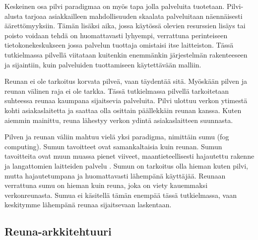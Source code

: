 Keskeinen osa pilvi paradigmaa on myös tapa jolla palveluita tuotetaan.
Pilvi-alusta tarjoaa asiakkailleen mahdollisuuden skaalata palveluitaan näennäisesti äärettömyyksiin.
Tämän lisäksi aika, jossa käytössä olevien resurssien lisäys tai poisto voidaan tehdä on huomattavasti lyhyempi, verrattuna perinteiseen tietokonekeskukseen jossa palvelun tuottaja omistaisi itse laitteiston.
Tässä tutkielmassa pilvellä viitataan kuitenkin enemmänkin järjestelmän rakenteeseen ja sijaintiin, kuin palveluiden tuottamiseen käytettävään malliin.

Reunan ei ole tarkoitus korvata pilveä, vaan täydentää sitä. Myöskään pilven ja reunan välinen raja ei ole tarkka. Tässä tutkielmassa pilvellä tarkoitetaan suhteessa reunaa kaumpana sijaitsevia palveluita. Pilvi ulottuu verkon ytimestä kohti asiakaslaitetta ja saattaa olla osittain päällekkäin reunan kanssa. Kuten aiemmin mainittu, reuna lähestyy verkon ydintä asiakaslaitteen suunnasta. 

Pilven ja reunan väliin mahtuu vielä yksi paradigma, nimittäin sumu (fog computing).
Sumun tavoitteet ovat samankaltaisia kuin reunan. Sumun tavoitteita ovat muun muassa pienet viiveet, maantieteellisesti hajautettu rakenne ja langattomien laitteiden palvelu \cite{bonomi2012fog}. Sumun on tarkoitus olla hieman kuten pilvi, mutta hajautetumpana ja huomattavasti lähempänä käyttäjää. Reunaan verrattuna sumu on hieman kuin reuna, joka on viety kauemmaksi verkonreunasta. Sumua ei käsitellä tämän enempää tässä tutkielmassa, vaan keskitymme lähempänä reunaa sijaitsevaan laskentaan.






\subsection{Reuna-arkkitehtuuri}


